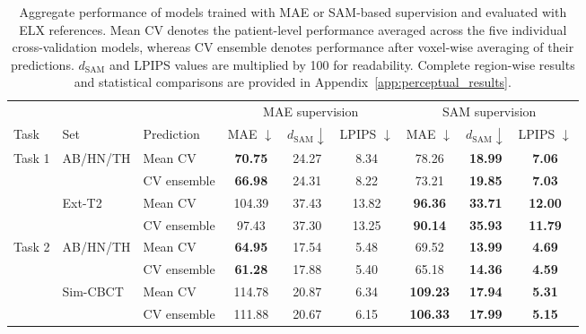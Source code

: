 \begin{table}[h!]
\centering
\scriptsize
\setlength{\tabcolsep}{4pt}
\renewcommand{\arraystretch}{1.15}
\caption{Aggregate performance of models trained with MAE or SAM-based supervision and evaluated with ELX references. Mean CV denotes the patient-level performance averaged across the five individual cross-validation models, whereas CV ensemble denotes performance after voxel-wise averaging of their predictions. $d_{\mathrm{SAM}}$ and LPIPS values are multiplied by 100 for readability. Complete region-wise results and statistical comparisons are provided in Appendix~\ref{app:perceptual_results}.}
\label{tab:sam_perceptual_compact}
\begin{tabular}{lllcccccc}
\toprule
& & & \multicolumn{3}{c}{MAE supervision}
& \multicolumn{3}{c}{SAM supervision} \\
\cmidrule(lr){4-6} \cmidrule(lr){7-9}
Task & Set & Prediction
& MAE $\downarrow$ & $d_{\mathrm{SAM}}\downarrow$ & LPIPS $\downarrow$
& MAE $\downarrow$ & $d_{\mathrm{SAM}}\downarrow$ & LPIPS $\downarrow$ \\
\midrule
\multirow{4}{*}{Task 1}
& \multirow{2}{*}{AB/HN/TH}
& Mean CV
& \textbf{70.75} & 24.27 & 8.34
& 78.26 & \textbf{18.99} & \textbf{7.06} \\
&
& CV ensemble
& \textbf{66.98} & 24.31 & 8.22
& 73.21 & \textbf{19.85} & \textbf{7.03} \\
\cmidrule(lr){2-9}
& \multirow{2}{*}{Ext-T2}
& Mean CV
& 104.39 & 37.43 & 13.82
& \textbf{96.36} & \textbf{33.71} & \textbf{12.00} \\
&
& CV ensemble
& 97.43 & 37.30 & 13.25
& \textbf{90.14} & \textbf{35.93} & \textbf{11.79} \\
\midrule
\multirow{4}{*}{Task 2}
& \multirow{2}{*}{AB/HN/TH}
& Mean CV
& \textbf{64.95} & 17.54 & 5.48
& 69.52 & \textbf{13.99} & \textbf{4.69} \\
&
& CV ensemble
& \textbf{61.28} & 17.88 & 5.40
& 65.18 & \textbf{14.36} & \textbf{4.59} \\
\cmidrule(lr){2-9}
& \multirow{2}{*}{Sim-CBCT}
& Mean CV
& 114.78 & 20.87 & 6.34
& \textbf{109.23} & \textbf{17.94} & \textbf{5.31} \\
&
& CV ensemble
& 111.88 & 20.67 & 6.15
& \textbf{106.33} & \textbf{17.99} & \textbf{5.15} \\
\bottomrule
\end{tabular}

\end{table}
